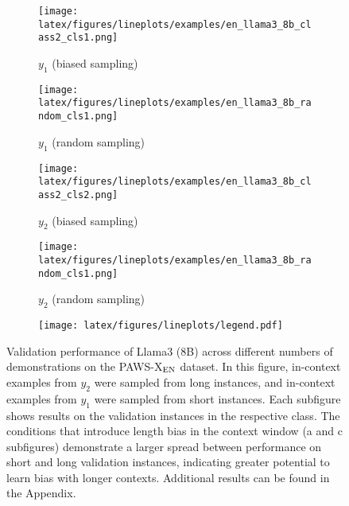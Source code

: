 \begin{figure}[t!]
    \centering
    \begin{minipage}[t]{\linewidth}
        \begin{subfigure}{0.49\linewidth}
            \centering
            \texttt{[image: latex/figures/lineplots/examples/en\_llama3\_8b\_class2\_cls1.png]}
            \caption{$y_1$ (biased sampling)}\label{fig:image1}
        \end{subfigure}%
        \hfill
        \begin{subfigure}{0.49\linewidth}
            \centering
            \texttt{[image: latex/figures/lineplots/examples/en\_llama3\_8b\_random\_cls1.png]}
            \caption{$y_1$ (random sampling)}\label{fig:image2}
        \end{subfigure}
        \hfill
        \begin{subfigure}{0.49\linewidth}
            \centering
            \texttt{[image: latex/figures/lineplots/examples/en\_llama3\_8b\_class2\_cls2.png]}
            \caption{$y_2$ (biased sampling)}\label{fig:image3}
        \end{subfigure}
        \hfill
        \begin{subfigure}{0.49\linewidth}
            \centering
            \texttt{[image: latex/figures/lineplots/examples/en\_llama3\_8b\_random\_cls1.png]}
            \caption{$y_2$ (random sampling)}\label{fig:image4}
        \end{subfigure}%
    \end{minipage}%
    \hfill
    \begin{minipage}[c]{\linewidth}
        \centering
        \vspace{2mm}
            \begin{subfigure}{0.7 \linewidth}
            \centering
            \texttt{[image: latex/figures/lineplots/legend.pdf]}
        \end{subfigure}%
    \end{minipage}
    \hfill
    \begin{minipage}[c]{\linewidth}
        \caption{\label{fig:num_ex} Validation performance of Llama3 (8B) across different numbers of demonstrations on the PAWS-X$_{\textsc{EN}}$ dataset. In this figure, in-context examples from $y_2$ were sampled from long instances, and in-context examples from $y_1$ were sampled from short instances. Each subfigure shows results on the validation instances in the respective class. The conditions that introduce length bias in the context window (a and c subfigures) demonstrate a larger spread between performance on short and long validation instances, indicating greater potential to learn bias with longer contexts. Additional results can be found in the Appendix.}
    \end{minipage}
\end{figure}